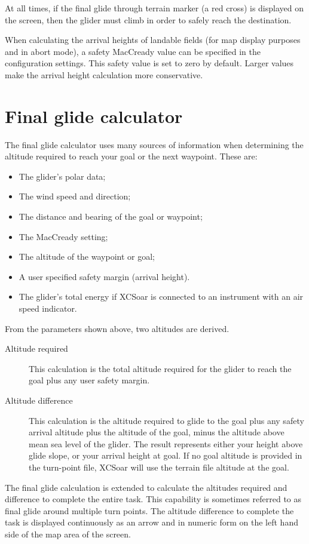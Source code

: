 At all times, if the final glide through terrain marker (a red
cross) is displayed on the screen, then the glider must climb in order
to safely reach the destination.

When calculating the arrival heights of landable fields (for map
display purposes and in abort mode), a safety MacCready value can be
specified in the configuration settings.  This safety value is set to
zero by default.  Larger values make the arrival height calculation
more conservative.

\section{Final glide calculator}

The final glide calculator uses many sources of information when
determining the altitude required to reach your goal or the next
waypoint. These are:

\begin{itemize}
\item The glider's polar data;
\item The wind speed and direction;
\item The distance and bearing of the goal or waypoint;
\item The MacCready setting;
\item The altitude of the waypoint or goal;
\item A user specified safety margin (arrival height).
\item The glider's total energy if XCSoar is connected to
  an instrument with an air speed indicator.
\end{itemize}

From the parameters shown above, two altitudes are derived.
\begin{description}
\item[Altitude required]
This calculation is the total altitude required for the glider to
reach the goal plus any user safety margin. 
\item[Altitude difference]
This calculation is the altitude required to glide to the goal plus
any safety arrival altitude plus the altitude of the goal, minus the
altitude above mean sea level of the glider.  The result represents
either your height above glide slope, or your arrival height at goal.
If no goal altitude is provided in the turn-point file, XCSoar will use
the terrain file altitude at the goal.
\end{description}

The final glide calculation is extended to calculate the altitudes
required and difference to complete the entire task.  This capability
is sometimes referred to as final glide around multiple turn points.
The altitude difference to complete the task is displayed continuously
as an arrow and in numeric form on the left hand side of the map area
of the screen.

